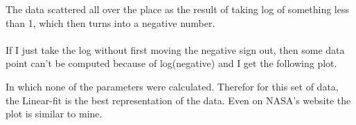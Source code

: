 \documentclass{article}
\begin{document}
The data scattered all over the place as the result of taking log of something less than 1, which then turns into a negative number.\\\\
If I just take the log without first moving the negative sign out, then some data point can't be computed because of log(negative) and I get the following plot.
\begin{figure}[H]
\end{figure}
In which none of the parameters were calculated. Therefor for this set of data, the Linear-fit is the best representation of the data. Even on NASA's website the plot is similar to mine.
\end{document}
